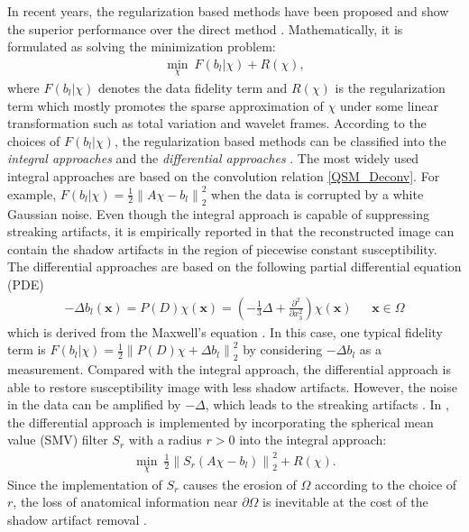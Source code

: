 \documentclass[reqno]{siamonline1116}
\numberwithin{theorem}{section}
\numberwithin{equation}{section}
\def\Om{\Omega}
\def\f{\frac}
\def\p{\partial}
\def\x{\boldsymbol{x}}
\begin{document}
In recent years, the regularization based methods have been proposed and show the superior performance over the direct method \cite{Y.Kee2017,S.Wang2013}. Mathematically, it is formulated as solving the minimization problem:
\begin{align}\label{Regularization}
\min_{\chi}~F(b_l|\chi)+R(\chi),
\end{align}
where $F(b_l|\chi)$ denotes the data fidelity term and $R(\chi)$ is the regularization term which mostly promotes the sparse approximation of $\chi$ under some linear transformation such as total variation and wavelet frames. According to the choices of $F(b_l|\chi)$, the regularization based methods can be classified into the \emph{integral approaches} and the \emph{differential approaches} \cite{Y.Kee2017}. The most widely used integral approaches are based on the convolution relation \cref{QSM_Deconv}. For example, $F(b_l|\chi)=\f{1}{2}\left\|A\chi-b_l\right\|_2^2$ when the data is corrupted by a white Gaussian noise. Even though the integral approach is capable of suppressing streaking artifacts, it is empirically reported in \cite{Y.Kee2017} that the reconstructed image can contain the shadow artifacts in the region of piecewise constant susceptibility. The differential approaches are based on the following partial differential equation (PDE)
\begin{align}\label{QSM_PDE}
-\Delta b_l(\x)=P(D)\chi(\x)=\left(-\f{1}{3}\Delta+\f{\p^2}{\p x_3^2}\right)\chi(\x)~~~~~~~\x\in\Om
\end{align}
which is derived from the Maxwell's equation \cite{E.M.Haacke1999,J.K.Seo2014}. In this case, one typical fidelity term is $F(b_l|\chi)=\f{1}{2}\left\|P(D)\chi+\Delta b_l\right\|_2^2$ by considering $-\Delta b_l$ as a measurement. Compared with the integral approach, the differential approach is able to restore susceptibility image with less shadow artifacts. However, the noise in the data can be amplified by $-\Delta$, which leads to the streaking artifacts \cite{Y.Wang2015}. In \cite{Y.Kee2017}, the differential approach is implemented by incorporating the spherical mean value (SMV) filter $S_r$ with a radius $r>0$ \cite{W.Li2014} into the integral approach:
\begin{align}\label{IntegralSMV}
\min_{\chi}~\f{1}{2}\left\|S_r\left(A\chi-b_l\right)\right\|_2^2+R(\chi).
\end{align}
Since the implementation of $S_r$ causes the erosion of $\Om$ according to the choice of $r$, the loss of anatomical information near $\p\Om$ is inevitable at the cost of the shadow artifact removal \cite{Y.Kee2017}.
\end{document}

